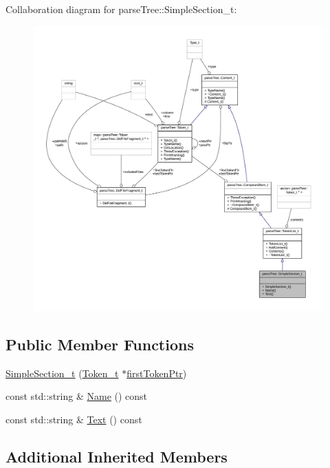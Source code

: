 Collaboration diagram for parse\+Tree\+:\+:Simple\+Section\+\_\+t\+:
\nopagebreak
\begin{figure}[H]
\begin{center}
\leavevmode
\includegraphics[width=350pt]{structparse_tree_1_1_simple_section__t__coll__graph}
\end{center}
\end{figure}
\subsection*{Public Member Functions}
\begin{DoxyCompactItemize}
\item 
\hyperlink{structparse_tree_1_1_simple_section__t_abf483fbac508a7b49f37b51676dc12af}{Simple\+Section\+\_\+t} (\hyperlink{structparse_tree_1_1_token__t}{Token\+\_\+t} $\ast$\hyperlink{structparse_tree_1_1_compound_item__t_a587020c943e760cb0152dd8cd31e21ef}{first\+Token\+Ptr})
\item 
const std\+::string \& \hyperlink{structparse_tree_1_1_simple_section__t_a20a8465f47437453737fcdb617ce8359}{Name} () const 
\item 
const std\+::string \& \hyperlink{structparse_tree_1_1_simple_section__t_ae4a12204fedbdfa4132d06f5d5651aad}{Text} () const 
\end{DoxyCompactItemize}
\subsection*{Additional Inherited Members}


